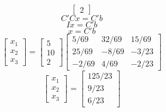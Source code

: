 \documentclass[12pt]{article}
\begin{document}
\begin{enumerate}
\[\begin{bmatrix}
    2
\end{bmatrix}
\]
\[
C'Cx = C'b
\]
\[
Ix = C'b
\]
\[
x = C'b
\]
\[
\begin{bmatrix}
    x_1 \\
    x_2 \\
    x_3
\end{bmatrix}
=
\begin{bmatrix}
    5 \\
    10 \\
    2
\end{bmatrix}
\begin{bmatrix}
    5/69 & 32/69 & 15/69 \\
    25/69 & -8/69 & -3/23 \\
    -2/69 & 4/69 & -2/23
\end{bmatrix}
\]
\[
\begin{bmatrix}
    x_1 \\
    x_2 \\
    x_3
\end{bmatrix}
=
\begin{bmatrix}
    125/23 \\
    9/23 \\
    6/23
\end{bmatrix}
\]
\end{enumerate}
\end{document}
